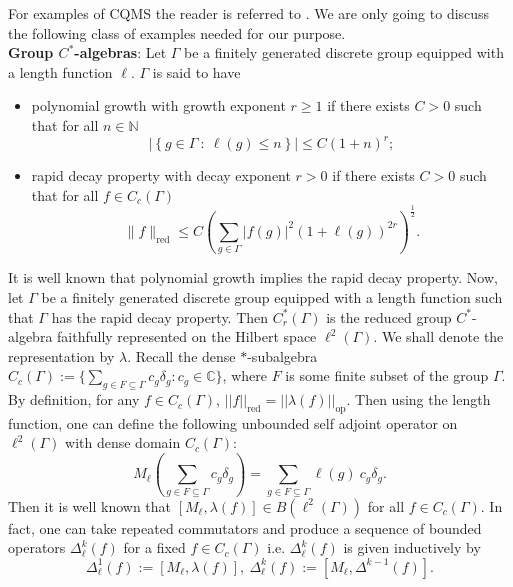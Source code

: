 \documentclass[a4paper,11pt,reqno]{amsart}
\theoremstyle{plain}
\theoremstyle{mainthmstyle}
\theoremstyle{named}
\numberwithin{equation}{section}
\begin{document}
For examples of CQMS the reader is referred to \cites{Rieffel2,Rieffel-1998-Metrics-on-state-from-action-of-cmpt-gp}. We are only going to discuss the following class of examples needed for our purpose.\vspace{0.05in}\\
 \textbf {Group $C^{\ast}$-algebras}: Let $\Gamma$ be a finitely generated discrete group equipped with a length function $\ell$. $\Gamma$ is said to have
 \begin{itemize}
     \item polynomial growth with growth exponent $r \geq 1$ if there exists $C > 0$ such that for all $n \in \mathbb N$ $$\left \lvert \left \{g \in \Gamma\ :\ \ell (g) \leq n \right \} \right \rvert \leq C (1 + n)^{r};$$
     \item rapid decay property with decay exponent $r > 0$ if there exists $C > 0$ such that for all $f \in C_c (\Gamma)$ $$\|f\|_{\mathrm {red}} \leq C \left (\sum\limits_{g \in \Gamma} \left \lvert f (g) \right \rvert^2 \left (1 + \ell (g) \right )^{2 r} \right )^{\frac {1} {2}}.$$
 \end{itemize}
 It is well known that polynomial growth implies the rapid decay property. Now, let $\Gamma$ be a finitely generated discrete group equipped with a length function such that $\Gamma$ has the rapid decay property. Then $C^{\ast}_{r}(\Gamma)$ is the reduced group $C^{\ast}$-algebra faithfully represented on the Hilbert space $\ell^{2}(\Gamma)$. We shall denote the representation by $\lambda$. Recall the dense $\ast$-subalgebra $C_{c}(\Gamma):=\{\sum_{g\in F\subseteq\Gamma}c_{g}\delta_{g}:c_{g}\in\mathbb{C}\}$, where $F$ is some finite subset of the group $\Gamma$. By definition, for any $f\in C_{c}(\Gamma)$, $\lvert\lvert f\rvert\rvert_{\textrm{red}}=\lvert\lvert\lambda(f)\rvert\rvert_{\textrm{op}}$. Then using the length function, one can define the following unbounded self adjoint operator on $\ell^{2}(\Gamma)$ with dense domain $C_{c}(\Gamma)$:
 \begin{displaymath}
     M_{\ell}\left(\sum\limits_{g\in F\subseteq\Gamma}c_{g}\delta_{g} \right )=\sum\limits_{g\in F\subseteq\Gamma}\ell(g)\ c_{g}\delta_{g}.
 \end{displaymath}
 Then it is well known that $[M_{\ell},\lambda(f)]\in B(\ell^{2}(\Gamma))$ for all $f\in C_{c}(\Gamma)$. In fact, one can take repeated commutators and produce a sequence of bounded operators $\Delta_{\ell}^{k}(f)$ for a fixed $f\in C_{c}(\Gamma)$ i.e. $\Delta^{k}_{\ell}(f)$ is given inductively by
 \begin{displaymath}
    \Delta_{\ell}^{1}(f):=[M_{\ell}, \lambda(f)], \  \Delta^{k}_{\ell}(f):=[M_{\ell},\Delta^{k-1}(f)].
 \end{displaymath}
\end{document}

